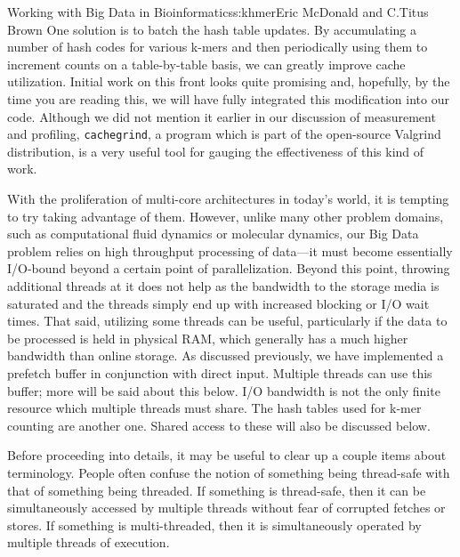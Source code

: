 \begin{aosachapter}{Working with Big Data in Bioinformatics}{s:khmer}{Eric McDonald and C.\/Titus Brown}
One solution is to batch the hash table updates. By accumulating a
number of hash codes for various k-mers and then periodically using them
to increment counts on a table-by-table basis, we can greatly improve
cache utilization. Initial work on this front looks quite promising and,
hopefully, by the time you are reading this, we will have fully
integrated this modification into our code. Although we did not mention
it earlier in our discussion of measurement and profiling,
\texttt{cachegrind}, a program which is part of the open-source Valgrind
\cite{web:Valgrind} distribution, is a very useful tool for gauging the
effectiveness of this kind of work.


With the proliferation of multi-core architectures in today's world, it
is tempting to try taking advantage of them. However, unlike many other
problem domains, such as computational fluid dynamics or molecular
dynamics, our Big Data problem relies on high throughput processing of
data---it must become essentially I/O-bound beyond a certain point of
parallelization. Beyond this point, throwing additional threads at it
does not help as the bandwidth to the storage media is saturated and the
threads simply end up with increased blocking or I/O wait times. That
said, utilizing some threads can be useful, particularly if the data to
be processed is held in physical RAM, which generally has a much higher
bandwidth than online storage. As discussed previously, we have
implemented a prefetch buffer in conjunction with direct input. Multiple
threads can use this buffer; more will be said about this below. I/O
bandwidth is not the only finite resource which multiple threads must
share. The hash tables used for k-mer counting are another one. Shared
access to these will also be discussed below.


Before proceeding into details, it may be useful to clear up a couple
items about terminology. People often confuse the notion of something
being thread-safe with that of something being threaded. If something is
thread-safe, then it can be simultaneously accessed by multiple threads
without fear of corrupted fetches or stores. If something is
multi-threaded, then it is simultaneously operated by multiple threads
of execution.


\end{aosachapter}
